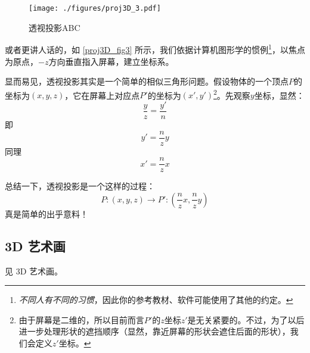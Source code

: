 \begin{figure}[ht]
\centering
\texttt{[image: ./figures/proj3D\_3.pdf]}
\caption{透视投影ABC} \label{proj3D_fig3}
\end{figure}
或者更讲人话的，如 \autoref{proj3D_fig3} 所示，我们依据计算机图形学的惯例\footnote{\textsl{不同人有不同的习惯}，因此你的参考教材、软件可能使用了其他的约定。}，以焦点为原点，$-z$方向垂直指入屏幕，建立坐标系。

显而易见，透视投影其实是一个简单的相似三角形问题。假设物体的一个顶点$P$的坐标为$(x,y,z)$，它在屏幕上对应点$P'$的坐标为$(x',y')$\footnote{由于屏幕是二维的，所以目前而言$P'$的$z$坐标$z'$是无关紧要的。不过，为了以后进一步处理形状的遮挡顺序（显然，靠近屏幕的形状会遮住后面的形状），我们会定义$z'$坐标。}。先观察$y$坐标，显然：
$$\frac{y}{z}=\frac{y'}{n}$$
即
$$y'=\frac{n}{z}y$$
同理
$$x'=\frac{n}{z}x$$

总结一下，透视投影是一个这样的过程：
$$P: (x,y,z) \to P': \left( \frac{n}{z}x, \frac{n}{z}y \right)$$
真是简单的出乎意料！


\subsection{3D 艺术画}
见 3D 艺术画。
